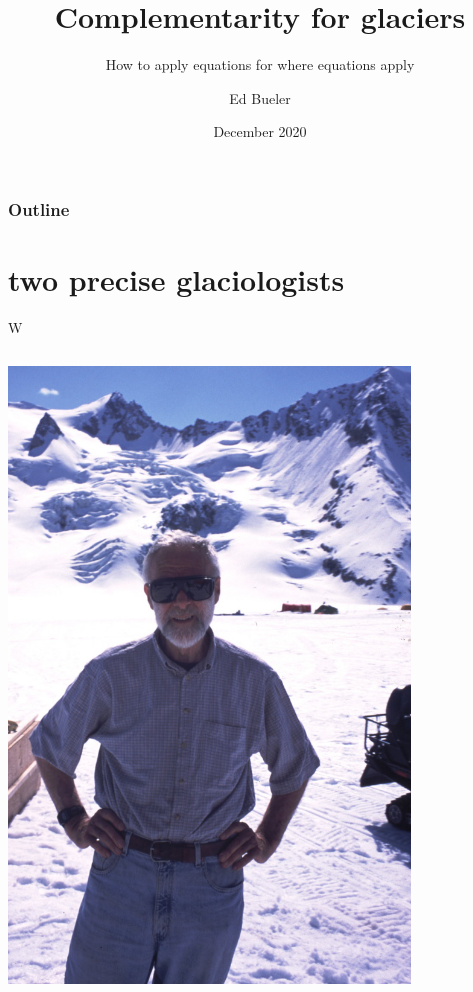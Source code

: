 \documentclass[10pt,hyperref,dvipsnames]{beamer}
\title{Complementarity for glaciers}
\subtitle{How to apply equations for where equations apply}
\author{Ed Bueler}
\institute[UAF]{University of Alaska Fairbanks}
\date{December 2020}
\begin{document}
\beamertemplatenavigationsymbolsempty

\begin{frame}
  \maketitle
\end{frame}

\begin{frame}
  \frametitle{Outline}
  \tableofcontents[hideallsubsections]
\end{frame}


\section{two precise glaciologists}

\begin{frame}{W}

\begin{columns}
\begin{column}{0.5\textwidth}
\includegraphics[width=0.8\textwidth]{figs/Will-by-Truffer.jpg}


\end{column}
\end{columns}
\end{frame}
\end{document}
